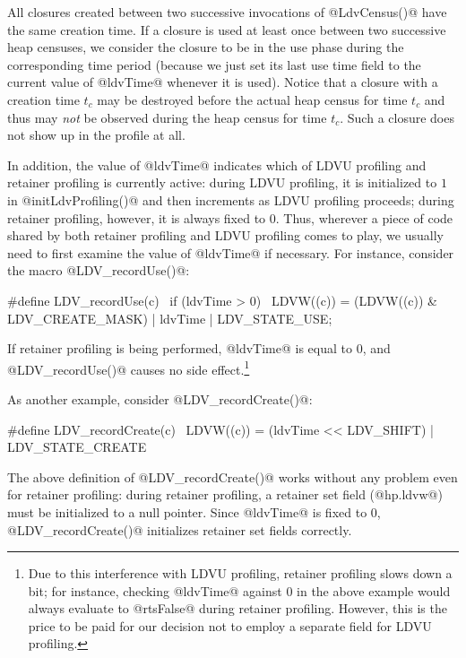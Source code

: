\documentclass{article}
\begin{document}
All closures created between two successive invocations of
@LdvCensus()@ have the same creation time.  If a closure is used at
least once between two successive heap censuses, we consider the
closure to be in the use phase during the corresponding time period
(because we just set its last use time field to the current value of
@ldvTime@ whenever it is used).  Notice that a closure with a creation
time $t_c$ may be destroyed before the actual heap census for time
$t_c$ and thus may \emph{not} be observed during the heap census for
time $t_c$.  Such a closure does not show up in the profile at all.

In addition, the value of @ldvTime@ indicates which of LDVU profiling
and retainer profiling is currently active: during LDVU profiling, it
is initialized to $1$ in @initLdvProfiling()@ and then increments as
LDVU profiling proceeds; during retainer profiling, however, it is
always fixed to $0$.  Thus, wherever a piece of code shared by both
retainer profiling and LDVU profiling comes to play, we usually need
to first examine the value of @ldvTime@ if necessary. For instance,
consider the macro @LDV_recordUse()@:

\begin{code}
#define LDV_recordUse(c)                              \
  if (ldvTime > 0)                                    \
    LDVW((c)) = (LDVW((c)) & LDV_CREATE_MASK) | ldvTime | LDV_STATE_USE; 
\end{code}

If retainer profiling is being performed, @ldvTime@ is equal to $0$,
and @LDV_recordUse()@ causes no side effect.\footnote{Due to this
interference with LDVU profiling, retainer profiling slows down a bit;
for instance, checking @ldvTime@ against $0$ in the above example
would always evaluate to @rtsFalse@ during retainer profiling.
However, this is the price to be paid for our decision not to employ a
separate field for LDVU profiling.}

As another example, consider @LDV_recordCreate()@:

\begin{code}
#define LDV_recordCreate(c)   \
  LDVW((c)) = (ldvTime << LDV_SHIFT) | LDV_STATE_CREATE
\end{code}

The above definition of @LDV_recordCreate()@ works without any problem
even for retainer profiling: during retainer profiling, 
a retainer set field (@hp.ldvw@) must be initialized to a null pointer.
Since @ldvTime@ is fixed to $0$, @LDV_recordCreate()@ initializes 
retainer set fields correctly.
\end{document}
